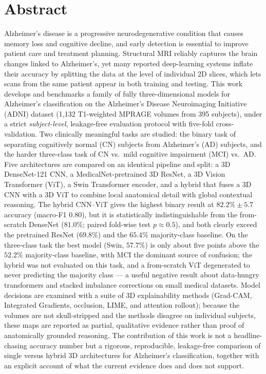 \newpage
\section*{Abstract}
Alzheimer's disease is a progressive neurodegenerative condition that causes memory loss and cognitive decline, and early detection is essential to improve patient care and treatment planning. Structural MRI reliably captures the brain changes linked to Alzheimer's, yet many reported deep-learning systems inflate their accuracy by splitting the data at the level of individual 2D slices, which lets scans from the same patient appear in both training and testing. This work develops and benchmarks a family of fully three-dimensional models for Alzheimer's classification on the Alzheimer's Disease Neuroimaging Initiative (ADNI) dataset (1{,}132 T1-weighted MPRAGE volumes from 395 subjects), under a strict \emph{subject-level}, leakage-free evaluation protocol with five-fold cross-validation. Two clinically meaningful tasks are studied: the binary task of separating cognitively normal (CN) subjects from Alzheimer's (AD) subjects, and the harder three-class task of CN vs.\ mild cognitive impairment (MCI) vs.\ AD. Five architectures are compared on an identical pipeline and split: a 3D DenseNet-121 CNN, a MedicalNet-pretrained 3D ResNet, a 3D Vision Transformer (ViT), a Swin Transformer encoder, and a hybrid that fuses a 3D CNN with a 3D ViT to combine local anatomical detail with global contextual reasoning. The hybrid CNN--ViT gives the highest binary result at $82.2\% \pm 5.7$ accuracy (macro-F1 $0.80$), but it is statistically indistinguishable from the from-scratch DenseNet ($81.0\%$; paired fold-wise test $p \approx 0.5$), and both clearly exceed the pretrained ResNet ($69.8\%$) and the $65.4\%$ majority-class baseline. On the three-class task the best model (Swin, $57.7\%$) is only about five points above the $52.2\%$ majority-class baseline, with MCI the dominant source of confusion; the hybrid was not evaluated on this task, and a from-scratch ViT degenerated to never predicting the majority class --- a useful negative result about data-hungry transformers and stacked imbalance corrections on small medical datasets. Model decisions are examined with a suite of 3D explainability methods (Grad-CAM, Integrated Gradients, occlusion, LIME, and attention rollout); because the volumes are not skull-stripped and the methods disagree on individual subjects, these maps are reported as partial, qualitative evidence rather than proof of anatomically grounded reasoning. The contribution of this work is not a headline-chasing accuracy number but a rigorous, reproducible, leakage-free comparison of single versus hybrid 3D architectures for Alzheimer's classification, together with an explicit account of what the current evidence does and does not support.
